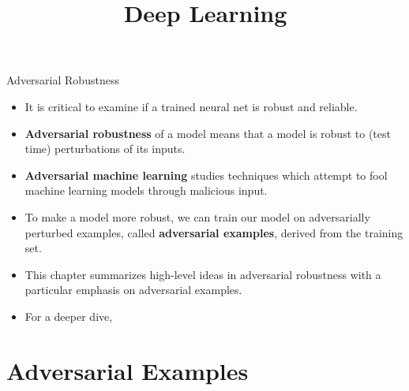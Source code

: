




\title{Deep Learning}

\date{}


\newcommand{\titlefigure}{plots/dog.png}
\newcommand{\learninggoals}{
  \item Adversarial robustness
  \item Adversarial examples
  \item Targeted attacks
}



\newcommand{\Dsubtrain}{\mathcal{D}_{\text{subtrain}}}
\newcommand{\Dval}{\mathcal{D}_{\text{val}}}


\begin{frame}{Adversarial Robustness}
    \begin{itemize}
        \item It is critical to examine if a trained neural net is robust and reliable. 
        \item \textbf{Adversarial robustness} of a model means that a model is robust to (test time) perturbations of its inputs. 
        \item \textbf{Adversarial machine learning} studies techniques which attempt  to fool machine learning models through malicious input.
        \item To make a model more robust, we can train our model on adversarially perturbed examples, called \textbf{adversarial examples}, derived from the training set.  
        \item This chapter summarizes  high-level ideas in adversarial robustness with a particular emphasis on adversarial examples.
        \item For a deeper dive, \href{https://adversarial-ml-tutorial.org/}{}
    \end{itemize}
\end{frame}


\section{Adversarial Examples}

